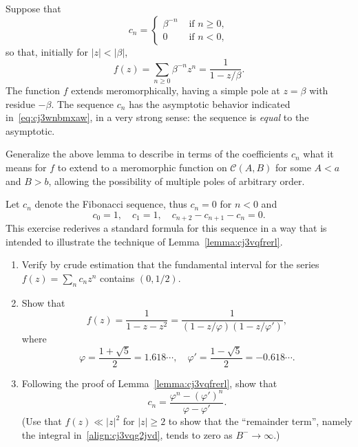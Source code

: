 \documentclass[reqno]{amsart}  \numberwithin{theorem}{section} \numberwithin{equation}{section}
\begin{document}
\begin{example}
  Suppose that
  \begin{equation*}
    c_n =
    \begin{cases}
      \beta^{- n} & \text{ if } n \geq 0, \\
      0 & \text{ if } n < 0,
    \end{cases}
  \end{equation*}
  so that, initially for $\lvert z \rvert < |\beta|$,
  \begin{equation*}
    f (z) = \sum_{n \geq 0} \beta^{-n} z^n = \frac{1}{1 - z / \beta }.
  \end{equation*}
  The function $f$ extends meromorphically, having a simple pole at $z = \beta$ with residue $-\beta$.  The sequence $c_n$ has the asymptotic behavior indicated in~\eqref{eq:cj3wnbmxaw}, in a very strong sense: the sequence is \emph{equal} to the asymptotic.
\end{example}

\begin{exercise}
  Generalize the above lemma to describe in terms of the coefficients $c_n$ what it means for $f$ to extend to a meromorphic function on $\mathcal{C}(A,B)$ for some $A < a$ and $B > b$, allowing the possibility of multiple poles of arbitrary order.
\end{exercise}

\begin{exercise}
  Let $c_n$ denote the Fibonacci sequence, thus $c_n = 0$ for $n < 0$ and
  \begin{equation*}
    c_0 = 1, \quad c_1 = 1, \quad
    c_{n+2} - c_{n+1} - c_n = 0.
  \end{equation*}
  This exercise rederives a standard formula for this sequence in a way that is intended to illustrate the technique of Lemma~\ref{lemma:cj3vqfrerl}.
  \begin{enumerate}
  \item Verify by crude estimation that the fundamental interval for the series $f(z) = \sum_n c_n z^n$ contains $(0,1/2)$.
  \item Show that
    \begin{equation*}
      f(z) = \frac{1}{1 - z - z^2} =
      \frac{1}{(1 - z/\varphi) ( 1 - z / \varphi ')},
    \end{equation*}
    where
    \begin{equation*}
      \varphi = \frac{1 + \sqrt{5}}{2} = 1.618 \dotsb, \quad
      \varphi ' = \frac{1 - \sqrt{5}}{2} = -0.618 \dotsb.
    \end{equation*}
  \item Following the proof of Lemma~\ref{lemma:cj3vqfrerl}, show that
    \begin{equation*}
      c_n = \frac{\varphi^n - {(\varphi ')}^n }{\varphi - \varphi ' }.
    \end{equation*}
    (Use that $f(z) \ll |z|^2$ for $|z| \geq 2$ to show that the ``remainder term'', namely the integral in~\eqref{align:cj3vqg2jvd}, tends to zero as $B^- \rightarrow \infty $.)
  \end{enumerate}
\end{exercise}
\end{document}
